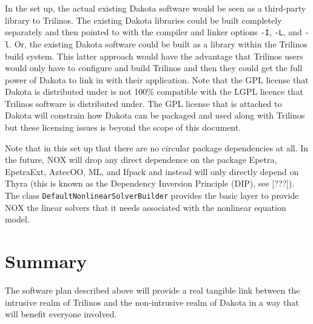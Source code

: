 \documentclass[pdf,ps2pdf,11pt]{SANDreport}
\begin{document}
In the set up, the actual existing Dakota software would be seen as a
third-party library to Trilinos.  The existing Dakota libraries could be built
completely separately and then pointed to with the compiler and linker
options {}\texttt{-I}, {}\texttt{-L}, and {}\texttt{-l}.  Or, the existing
Dakota software could be built as a library within the Trilinos build system.
This latter approach would have the advantage that Trilinos users would only
have to configure and build Trilinos and then they could get the full power of
Dakota to link in with their application.  Note that the GPL license that
Dakota is distributed under is not 100\% compatible with the LGPL licence that
Trilinos software is distributed under.  The GPL license that is attached to
Dakota will constrain how Dakota can be packaged and used along with Trilinos
but these licensing issues is beyond the scope of this document.

Note that in this set up that there are no circular package dependencies at
all.  In the future, NOX will drop any direct dependence on the package
Epetra, EpetraExt, AztecOO, ML, and Ifpack and instead will only directly
depend on Thyra (this is known as the Dependency Inversion Principle (DIP),
see [???]).  The class {}\texttt{Default\-Nonlinear\-Solver\-Builder} provides
the basic layer to provide NOX the linear solvers that it needs associated
with the nonlinear equation model.


%
\section{Summary}
%

The software plan described above will provide a real tangible link between
the intrusive realm of Trilinos and the non-intrusive realm of Dakota in a way
that will benefit everyone involved.


\begin{SANDdistribution}[NM]
\end{SANDdistribution}
\end{document}
